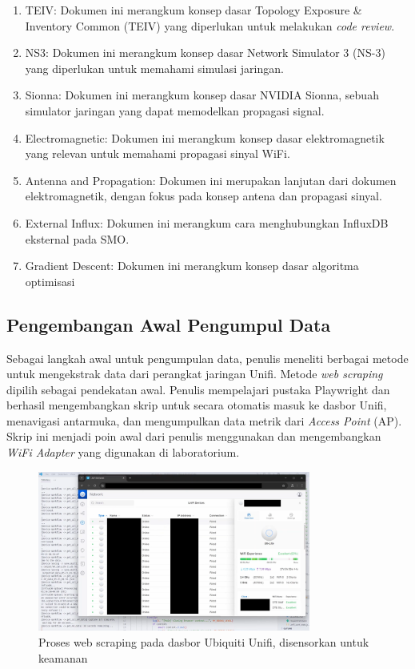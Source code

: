 \begin{enumerate}
    \item TEIV: Dokumen ini merangkum konsep dasar Topology Exposure \& Inventory Common (TEIV) yang diperlukan untuk melakukan \textit{code review}.
    \item NS3: Dokumen ini merangkum konsep dasar Network Simulator 3 (NS-3) yang diperlukan untuk memahami simulasi jaringan.
    \item Sionna: Dokumen ini merangkum konsep dasar NVIDIA Sionna, sebuah simulator jaringan yang dapat memodelkan propagasi signal.
    \item Electromagnetic: Dokumen ini merangkum konsep dasar elektromagnetik yang relevan untuk memahami propagasi sinyal WiFi.
    \item Antenna and Propagation: Dokumen ini merupakan lanjutan dari dokumen elektromagnetik, dengan fokus pada konsep antena dan propagasi sinyal.
    \item External Influx: Dokumen ini merangkum cara menghubungkan InfluxDB eksternal pada SMO.
    \item Gradient Descent: Dokumen ini merangkum konsep dasar algoritma optimisasi
\end{enumerate}
	
\subsection{Pengembangan Awal Pengumpul Data}
Sebagai langkah awal untuk pengumpulan data, penulis meneliti berbagai metode untuk mengekstrak data dari perangkat jaringan Unifi. Metode \textit{web scraping} dipilih sebagai pendekatan awal. Penulis mempelajari pustaka Playwright dan berhasil mengembangkan skrip untuk secara otomatis masuk ke dasbor Unifi, menavigasi antarmuka, dan mengumpulkan data metrik dari \textit{Access Point} (AP). Skrip ini menjadi poin awal dari penulis menggunakan dan mengembangkan \textit{WiFi Adapter} yang digunakan di laboratorium.

\begin{figure}[htbp]
    \centering
    \includegraphics[width=0.8\textwidth]{assets/pics/unifi.png}
    \caption{Proses web scraping pada dasbor Ubiquiti Unifi, disensorkan untuk keamanan}
    \label{fig:unifi}
\end{figure}


